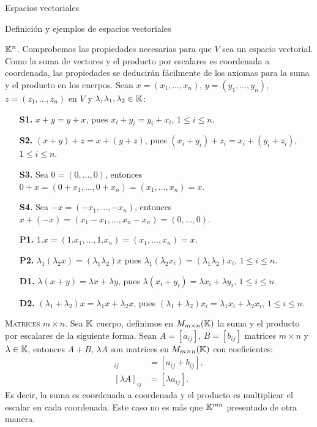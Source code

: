 \begin{chapter}{Espacios vectoriales}
\begin{section}{Definici\'on y ejemplos de espacios vectoriales}
\begin{ejemplo*} {\textsc{$\mathbb K^n$.}}
                Comprobemos las propiedades necesarias para que $V$ sea un espacio vectorial. Como la suma de vectores y el producto por escalares es coordenada a coordenada, las propiedades se deducirán fácilmente de los axiomas para la suma y el producto en los cuerpos.  Sean $x =  (x_1,\ldots,x_n)$, $y = (y_1,\ldots,y_n)$, $z = (z_1,\ldots,z_n)$ en $V$ y $\lambda, \lambda_1,\lambda_2 \in \mathbb K$:
                \begin{enumerate}
                    \item[\textbf{S1.}] $x + y = y +x$, pues $x_i + y_i = y_i + x_i$, $1 \le i \le n$.
                    \item[\textbf{S2.}]  $(x+ y)+ z = x + (y+z)$,  pues $(x_i + y_i) + z_i = x_i + (y_i + z_i)$, $1 \le i \le n$. 
                    \item[\textbf{S3.}] Sea $0 = (0,\ldots,0)$,  entonces $0+x = (0+x_1,\ldots, 0+x_n) =(x_1,\ldots,x_n) =x$.
                    \item[\textbf{S4.}] Sea $-x = (-x_1,\ldots,-x_n)$,  entonces $x + (-x) = (x_1-x_1,\ldots,x_n-x_n) =  (0,\ldots,0)$.
                    \item[\textbf{P1.}] $1.x=(1.x_1,\ldots,1.x_n) = (x_1,\ldots,x_n)=x$.
                    \item[\textbf{P2.}] $\lambda_1(\lambda_2x) = (\lambda_1\lambda_2)x$ pues $\lambda_1(\lambda_2x_i) =(\lambda_1\lambda_2)x_i$, $1 \le i \le n$.
                    \item[\textbf{D1.}] $\lambda(x+y) = \lambda x +\lambda y$,  pues $\lambda(x_i+y_i) = \lambda x_i + \lambda y_i$, $1 \le i \le n$.
                    \item[\textbf{D2.}] $(\lambda_1+\lambda_2)x = \lambda_1x + \lambda_2 x$, pues $ (\lambda_1+\lambda_2)x_i = \lambda_1x_i + \lambda_2 x_i$, $1 \le i \le n$.
                \end{enumerate} 
                
                
            \end{ejemplo*}
            
            \medspace
            
            \begin{ejemplo*}{\textsc{Matrices $m \times n$.}} Sea $\mathbb K$ cuerpo,  definimos en $M_{m \times n}(\mathbb K)$ la suma  y el producto por escalares de la siguiente forma. Sean $A = [a_{ij}]$, $B = [b_{ij}]$ matrices $m \times n$ y $ \lambda \in \mathbb K$, entonces $A+B$, $\lambda A$ son matrices en $M_{m \times n}(\mathbb K)$ con coeficientes:
                \begin{align*}
                [A + B]_{ij} &= [a_{ij} + b_{ij}], \\
                [\lambda A]_{ij} &= [\lambda a_{ij}]. 
                \end{align*}
                Es decir, la suma es coordenada a coordenada y el producto es multiplicar el escalar en cada coordenada. Este caso no es más que $\mathbb K^{mn}$ presentado de otra manera. 
                

\end{ejemplo*}
\end{section}
\end{chapter}
